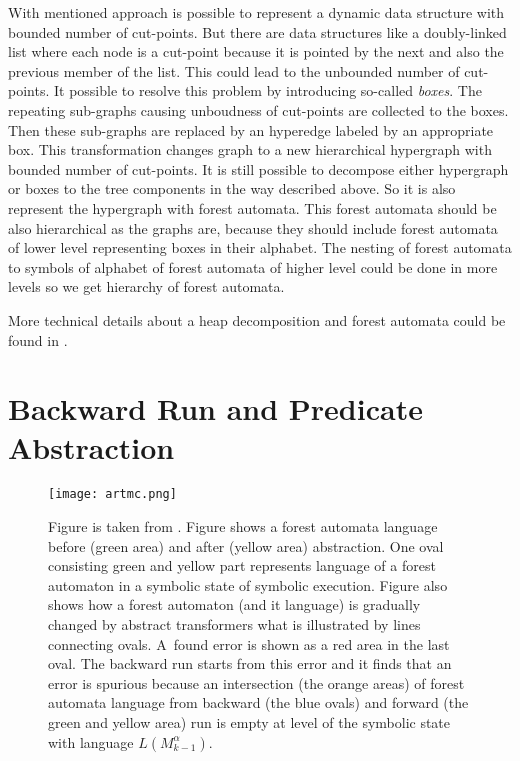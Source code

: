 \documentclass[fleqn,11pt]{ExcelAtFIT} %
\begin{document}
With mentioned approach is possible to represent a dynamic data structure with bounded number of cut-points.
But there are data structures like a doubly-linked list where each node is a cut-point because
it is pointed by the next and also the previous member of the list.
This could lead to the unbounded number of cut-points.
It possible to resolve this problem by introducing so-called \emph{boxes}.
The repeating sub-graphs causing unboudness of cut-points are collected to the boxes.
Then these sub-graphs are replaced by an hyperedge labeled by an appropriate box.
This transformation changes graph to a new hierarchical hypergraph with bounded number of cut-points.
It is still possible to decompose either hypergraph or boxes to the tree components in the way
described above.
So it is also represent the hypergraph with forest automata.
This forest automata should be also hierarchical as the graphs are, because they
should include forest automata of lower level representing boxes in their alphabet.
The nesting of forest automata to symbols of alphabet of forest automata of higher level
could be done in more levels so we get hierarchy of forest automata.

More technical details about a heap decomposition and forest automata could be found in \cite{forester11, forester13}.

\section{Backward Run and Predicate Abstraction}
\label{sec:br}

\begin{figure}[t]
	\centering
	\texttt{[image: artmc.png]}
	\caption{
		Figure is taken from \cite{artmc}.
		Figure shows a forest automata language before (green area)
		and after (yellow area) abstraction.
		One oval consisting green and yellow part represents
		language of a forest automaton in a symbolic state of symbolic execution.
		Figure also shows how a forest automaton (and it language) is gradually changed
		by abstract transformers what is illustrated by lines connecting ovals.
		A~found error is shown as a red area in the last oval.
		The backward run starts from this error and it finds
		that an error is spurious because an intersection (the orange areas) of forest automata language from backward (the blue ovals)
		and forward (the green and yellow area) run is empty at level of the symbolic state with language $L(M^{\alpha}_{k-1})$.}
	\label{fig:bwrun}
\end{figure}
\end{document}
